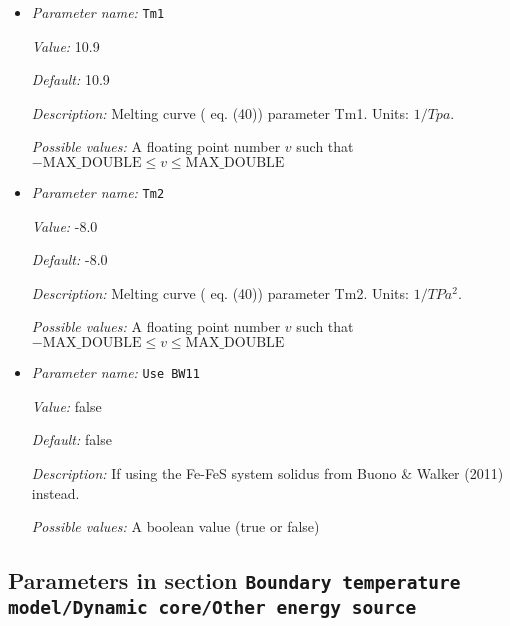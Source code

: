 \begin{itemize}
{\it Possible values:} A floating point number $v$ such that $0 \leq v \leq \text{MAX\_DOUBLE}$
\item {\it Parameter name:} {\tt Tm1}
\label{parameters:Boundary temperature model/Dynamic core/Geotherm parameters/Tm1}
\label{parameters:Boundary_20temperature_20model/Dynamic_20core/Geotherm_20parameters/Tm1}


{\it Value:} 10.9


{\it Default:} 10.9


{\it Description:} Melting curve (\cite{NPB+04} eq. (40)) parameter Tm1. Units: $1/Tpa$.


{\it Possible values:} A floating point number $v$ such that $-\text{MAX\_DOUBLE} \leq v \leq \text{MAX\_DOUBLE}$
\item {\it Parameter name:} {\tt Tm2}
\label{parameters:Boundary temperature model/Dynamic core/Geotherm parameters/Tm2}
\label{parameters:Boundary_20temperature_20model/Dynamic_20core/Geotherm_20parameters/Tm2}


{\it Value:} -8.0


{\it Default:} -8.0


{\it Description:} Melting curve (\cite{NPB+04} eq. (40)) parameter Tm2. Units: $1/TPa^2$.


{\it Possible values:} A floating point number $v$ such that $-\text{MAX\_DOUBLE} \leq v \leq \text{MAX\_DOUBLE}$
\item {\it Parameter name:} {\tt Use BW11}
\label{parameters:Boundary temperature model/Dynamic core/Geotherm parameters/Use BW11}
\label{parameters:Boundary_20temperature_20model/Dynamic_20core/Geotherm_20parameters/Use_20BW11}


{\it Value:} false


{\it Default:} false


{\it Description:} If using the Fe-FeS system solidus from Buono \& Walker (2011) instead.


{\it Possible values:} A boolean value (true or false)
\end{itemize}

\subsection{Parameters in section \tt Boundary temperature model/Dynamic core/Other energy source}
\label{parameters:Boundary_20temperature_20model/Dynamic_20core/Other_20energy_20source}

